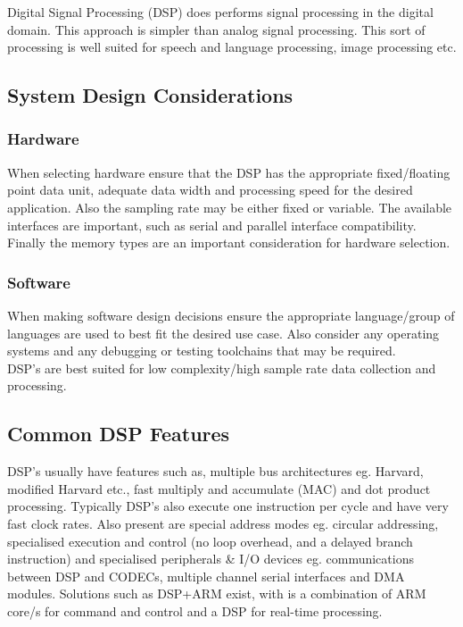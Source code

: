 Digital Signal Processing (DSP) does performs signal processing in the digital domain. This approach
is simpler than analog signal processing. This sort of processing is well suited for speech and
language processing, image processing etc.

\subsection{System Design Considerations}
\subsubsection{Hardware}
When selecting hardware ensure that the DSP has the appropriate fixed/floating point data unit,
adequate data width and processing speed for the desired application. Also the sampling rate may be
either fixed or variable. The available interfaces are important, such as serial and parallel
interface compatibility. Finally the memory types are an important consideration for hardware
selection.

\subsubsection{Software}
When making software design decisions ensure the appropriate language/group of languages are used to
best fit the desired use case. Also consider any operating systems and any debugging or testing
toolchains that may be required.\\

\noindent DSP's are best suited for low complexity/high sample rate data collection and processing.



\subsection{Common DSP Features}
DSP's usually have features such as, multiple bus architectures eg. Harvard, modified Harvard etc.,
fast multiply and accumulate (MAC) and dot product processing. Typically DSP's also execute one
instruction per cycle and have very fast clock rates. Also present are special address modes eg.
circular addressing, specialised execution and control (no loop overhead, and a delayed branch
instruction) and specialised peripherals \& I/O devices eg. communications between DSP and CODECs,
multiple channel serial interfaces and DMA modules. Solutions such as DSP+ARM exist, with is a
combination of ARM core/s for command and control and a DSP for real-time processing.

